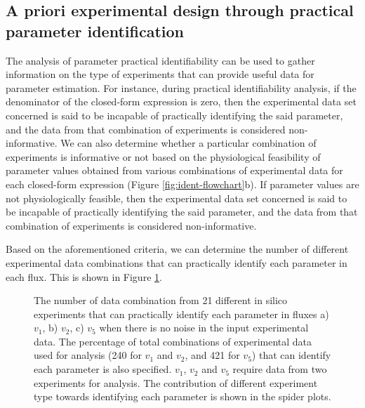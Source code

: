 \documentclass[10pt]{article}
\begin{document}
	\subsection{A priori experimental design through practical parameter identification}\label{sec:design}	
	The analysis of parameter practical identifiability can be used to gather information on the type of experiments that can provide useful data for parameter estimation. For instance, during practical identifiability analysis, if the denominator of the closed-form expression is zero, then the experimental data set concerned is said to be incapable of practically identifying the said parameter, and the data from that combination of experiments is considered non-informative. We can also determine whether a particular combination of experiments is informative or not based on the physiological feasibility of parameter values obtained from various combinations of experimental data for each closed-form expression (Figure \ref{fig:ident-flowchart}b). If parameter values are not physiologically feasible, then the experimental data set concerned is said to be incapable of practically identifying the said parameter, and the data from that combination of experiments is considered non-informative.
	
	Based on the aforementioned criteria, we can determine the number of different experimental data combinations that can practically identify each parameter in each flux. This is shown in Figure \ref{fig:ident}.
	
	\begin{figure}[!tbhp]
		\caption{The number of data combination from 21 different in silico experiments that can practically identify each parameter in fluxes a) $v_1$, b) $v_2$, c) $v_5$ when there is no noise in the input experimental data. The percentage of total combinations of experimental data used for analysis (240 for $v_1$ and $v_2$, and 421 for $v_5$) that can identify each parameter is also specified. $v_1$, $v_2$ and $v_5$ require data from two experiments for analysis. The contribution of different experiment type towards identifying each parameter is shown in the spider plots.}\label{fig:ident}
	\end{figure}
	
\end{document}
